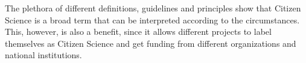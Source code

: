 The plethora of different definitions, guidelines and principles show that Citizen Science is a broad term that can be interpreted according to the circumstances.
This, however, is also a benefit, since it allows different projects to label themselves as Citizen Science and get funding from different organizations and national institutions.




%
%